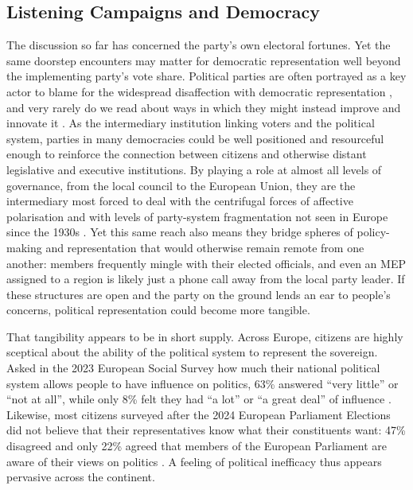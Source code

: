 \documentclass[11pt,a4paper]{scrartcl}
\begin{document}

\subsection{Listening Campaigns and Democracy}

The discussion so far has concerned the party's own electoral fortunes. Yet the same doorstep encounters may matter for democratic representation well beyond the implementing party's vote share. Political parties are often portrayed as a key actor to blame for the widespread disaffection with democratic representation \autocites[see e.g.][]{katzChangingModelsParty1995}{Michels1910}, and very rarely do we read about ways in which they might instead improve and innovate it \autocite{farrellDemocraticInnovationPolitical2025}. As the intermediary institution linking voters and the political system, parties in many democracies could be well positioned and resourceful enough to reinforce the connection between citizens and otherwise distant legislative and executive institutions. By playing a role at almost all levels of governance, from the local council to the European Union, they are the intermediary most forced to deal with the centrifugal forces of affective polarisation \autocite{reiljanFearLoathingParty2020a} and with levels of party-system fragmentation not seen in Europe since the 1930s \autocite{casalbertoaWhoGovernsEurope2022}. Yet this same reach also means they bridge spheres of policy-making and representation that would otherwise remain remote from one another: members frequently mingle with their elected officials, and even an MEP assigned to a region is likely just a phone call away from the local party leader. If these structures are open and the party on the ground lends an ear to people's concerns, political representation could become more tangible.

That tangibility appears to be in short supply. Across Europe, citizens are highly sceptical about the ability of the political system to represent the sovereign. Asked in the 2023 European Social Survey how much their national political system allows people to have influence on politics, 63\% answered \enquote{very little} or \enquote{not at all}, while only 8\% felt they had \enquote{a lot} or \enquote{a great deal} of influence \autocite{essericESS11IntegratedFile2024}. Likewise, most citizens surveyed after the 2024 European Parliament Elections did not believe that their representatives know what their constituents want: 47\% disagreed and only 22\% agreed that members of the European Parliament are aware of their views on politics \autocite{ZA8868}. A feeling of political inefficacy thus appears pervasive across the continent.
\end{document}
